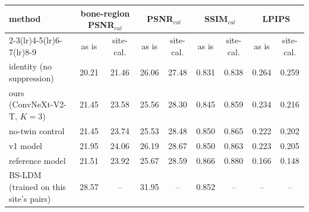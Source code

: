 \begin{tabular}{lcccccccc}
\toprule
method & \multicolumn{2}{c}{bone-region PSNR$_{cal}$} & \multicolumn{2}{c}{PSNR$_{cal}$} & \multicolumn{2}{c}{SSIM$_{cal}$} & \multicolumn{2}{c}{LPIPS} \\
\cmidrule(lr){2-3}\cmidrule(lr){4-5}\cmidrule(lr){6-7}\cmidrule(lr){8-9}
 & as is & site-cal. & as is & site-cal. & as is & site-cal. & as is & site-cal. \\
\midrule
identity (no suppression) & 20.21 & 21.46 & 26.06 & 27.48 & 0.831 & 0.838 & 0.264 & 0.259 \\
ours (ConvNeXt-V2-T, $K=3$) & 21.45 & 23.58 & 25.56 & 28.30 & 0.845 & 0.859 & 0.234 & 0.216 \\
no-twin control & 21.45 & 23.74 & 25.53 & 28.48 & 0.850 & 0.865 & 0.222 & 0.202 \\
v1 model & 21.95 & 24.06 & 26.19 & 28.67 & 0.850 & 0.863 & 0.223 & 0.205 \\
reference model & 21.51 & 23.92 & 25.67 & 28.59 & 0.866 & 0.880 & 0.166 & 0.148 \\
BS-LDM (trained on this site's pairs) & 28.57 & -- & 31.95 & -- & 0.852 & -- & -- & -- \\
\bottomrule
\end{tabular}
